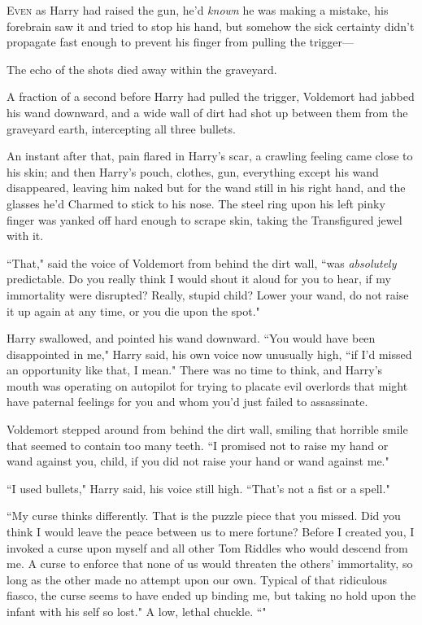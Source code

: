 
\lettrine{E}{ven} as Harry had raised the gun, he'd \emph{known} he was making a mistake, his forebrain saw it and tried to stop his hand, but somehow the sick certainty didn't propagate fast enough to prevent his finger from pulling the trigger—

The echo of the shots died away within the graveyard.

A fraction of a second before Harry had pulled the trigger, Voldemort had jabbed his wand downward, and a wide wall of dirt had shot up between them from the graveyard earth, intercepting all three bullets.

An instant after that, pain flared in Harry's scar, a crawling feeling came close to his skin; and then Harry's pouch, clothes, gun, everything except his wand disappeared, leaving him naked but for the wand still in his right hand, and the glasses he'd Charmed to stick to his nose. The steel ring upon his left pinky finger was yanked off hard enough to scrape skin, taking the Transfigured jewel with it.

``That," said the voice of Voldemort from behind the dirt wall, ``was \emph{absolutely} predictable. Do you really think I would shout it aloud for you to hear, if my immortality were disrupted? Really, stupid child? Lower your wand, do not raise it up again at any time, or you die upon the spot."

Harry swallowed, and pointed his wand downward. ``You would have been disappointed in me," Harry said, his own voice now unusually high, ``if I'd missed an opportunity like that, I mean." There was no time to think, and Harry's mouth was operating on autopilot for trying to placate evil overlords that might have paternal feelings for you and whom you'd just failed to assassinate.

Voldemort stepped around from behind the dirt wall, smiling that horrible smile that seemed to contain too many teeth. ``I promised not to raise my hand or wand against you, child, if you did not raise your hand or wand against me."

``I used bullets," Harry said, his voice still high. ``That's not a fist or a spell."

``My curse thinks differently. That is the puzzle piece that you missed. Did you think I would leave the peace between us to mere fortune? Before I created you, I invoked a curse upon myself and all other Tom Riddles who would descend from me. A curse to enforce that none of us would threaten the others' immortality, so long as the other made no attempt upon our own. Typical of that ridiculous fiasco, the curse seems to have ended up binding me, but taking no hold upon the infant with his self so lost." A low, lethal chuckle. ``"

